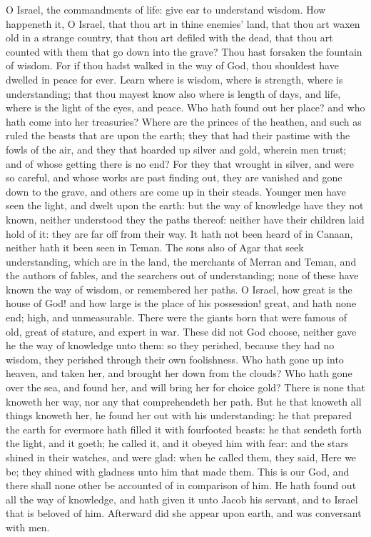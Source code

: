  O Israel, the commandments of life: give ear to understand wisdom. How happeneth it, O Israel, that thou art in thine enemies' land, that thou art waxen old in a strange country, that thou art defiled with the dead, that thou art counted with them that go down into the grave? Thou hast forsaken the fountain of wisdom. For if thou hadst walked in the way of God, thou shouldest have dwelled in peace for ever. Learn where is wisdom, where is strength, where is understanding; that thou mayest know also where is length of days, and life, where is the light of the eyes, and peace. Who hath found out her place? and who hath come into her treasuries? Where are the princes of the heathen, and such as ruled the beasts that are upon the earth; they that had their pastime with the fowls of the air, and they that hoarded up silver and gold, wherein men trust; and of whose getting there is no end? For they that wrought in silver, and were so careful, and whose works are past finding out, they are vanished and gone down to the grave, and others are come up in their steads. Younger men have seen the light, and dwelt upon the earth: but the way of knowledge have they not known, neither understood they the paths thereof: neither have their children laid hold of it: they are far off from their way. It hath not been heard of in Canaan, neither hath it been seen in Teman. The sons also of Agar that seek understanding, which are in the land, the merchants of Merran and Teman, and the authors of fables, and the searchers out of understanding; none of these have known the way of wisdom, or remembered her paths. O Israel, how great is the house of God! and how large is the place of his possession! great, and hath none end; high, and unmeasurable. There were the giants born that were famous of old, great of stature, and expert in war. These did not God choose, neither gave he the way of knowledge unto them: so they perished, because they had no wisdom, they perished through their own foolishness. Who hath gone up into heaven, and taken her, and brought her down from the clouds? Who hath gone over the sea, and found her, and will bring her for choice gold? There is none that knoweth her way, nor any that comprehendeth her path. But he that knoweth all things knoweth her, he found her out with his understanding: he that prepared the earth for evermore hath filled it with fourfooted beasts: he that sendeth forth the light, and it goeth; he called it, and it obeyed him with fear: and the stars shined in their watches, and were glad: when he called them, they said, Here we be; they shined with gladness unto him that made them. This is our God, and there shall none other be accounted of in comparison of him. He hath found out all the way of knowledge, and hath given it unto Jacob his servant, and to Israel that is beloved of him. Afterward did she appear upon earth, and was conversant with men.

